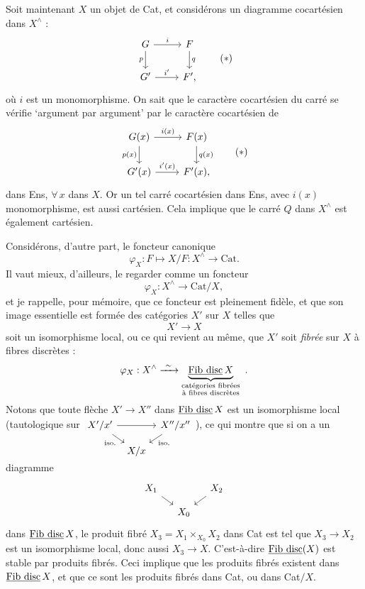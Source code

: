 Soit maintenant $X$ un objet de Cat, et considérons un diagramme cocartésien dans $X^{\wedge}$ :
\[
\begin{tikzcd}
G \ar[r, "i"] \ar[d, "p"'] & F \ar[d, "q"] \\
G' \ar[r, "i'"] & F',
\end{tikzcd}
\tag*{$(*)$}
\]
où $i$ est un monomorphisme. On sait que le caractère cocartésien du carré se vérifie `argument par argument' par le caractère cocartésien de
\[
\begin{tikzcd}
G(x) \ar[r, "i(x)"] \ar[d, "p(x)"'] & F(x) \ar[d, "q(x)"] \\
G'(x) \ar[r, "i'(x)"] & F'(x),
\end{tikzcd}
\tag*{$(*)$}
\]
dans Ens, $\forall\, x$ dans $X$. Or un tel carré cocartésien dans Ens, avec $i(x)$ monomorphisme, est aussi cartésien. Cela implique que le carré $Q$ dans $X^{\wedge}$ est également cartésien.

Considérons, d'autre part, le foncteur canonique
\[
\varphi_X : F \longmapsto X/F : X^{\wedge} \longrightarrow \mathrm{Cat}.
\]
Il vaut mieux, d'ailleurs, le regarder comme un foncteur
\[
\varphi_X : X^{\wedge} \longrightarrow \mathrm{Cat}/X,
\]
et je rappelle, pour mémoire, que ce foncteur est pleinement fidèle, et que son image essentielle est formée des catégories $X'$ sur $X$ telles que
\[
X' \longrightarrow X
\]
soit un isomorphisme local, ou ce qui revient au même, que $X'$ soit \textit{fibrée} sur $X$ à fibres discrètes :
\[
\varphi_X : X^{\wedge} \xrightarrow{\ \sim\ } \underbrace{\Fibdisc\, X}_{\substack{\text{catégories fibrées}\\ \text{à fibres discrètes}}} \ .
\]
Notons que toute flèche $X' \longrightarrow X''$ dans $\underline{\mathrm{Fib\ disc}}\, X$ est un isomorphisme local (tautologique sur $\begin{tikzcd}[ampersand replacement=\&, row sep=small, column sep=tiny, baseline=(\tikzcdmatrixname-1-1.base)] X'/x' \ar[rr] \ar[dr, "\text{iso.}"'] \& \& X''/x'' \ar[dl, "\text{iso.}"] \\ \& X/x \& \end{tikzcd}$), ce qui montre que si on a un diagramme
\[
\begin{tikzcd}[row sep=small, column sep=small]
X_1 \ar[dr] & & X_2 \ar[dl] \\
& X_0 &
\end{tikzcd}
\]
dans $\underline{\mathrm{Fib\ disc}}\, X$, le produit fibré $X_3 = X_1 \times_{X_0} X_2$ dans Cat est tel que $X_3 \longrightarrow X_2$ est un isomorphisme local, donc aussi $X_3 \longrightarrow X$. C'est-à-dire $\underline{\mathrm{Fib\ disc}}(X)$ est stable par produits fibrés. Ceci implique que les produits fibrés existent dans $\underline{\mathrm{Fib\ disc}}\, X$, et que ce sont les produits fibrés dans Cat, ou dans Cat$/X$.

